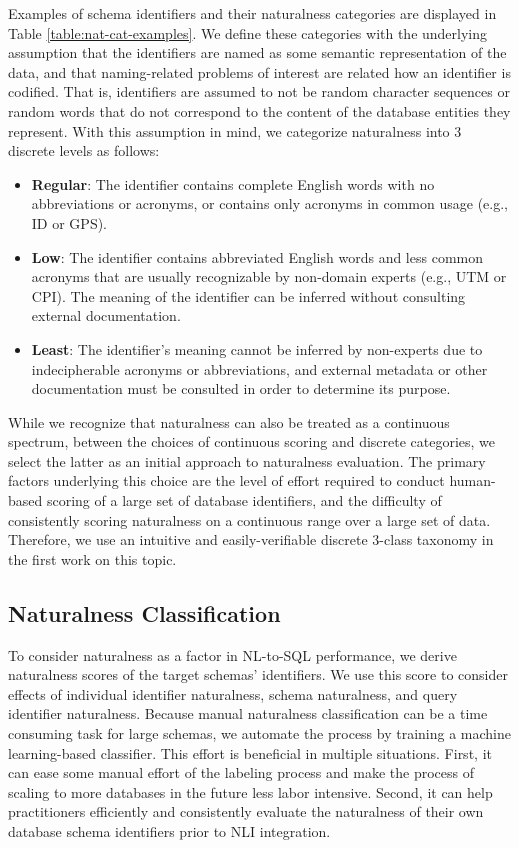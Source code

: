 Examples of schema identifiers and their naturalness categories are displayed in Table \ref{table:nat-cat-examples}.
We define these categories with the underlying assumption that the identifiers are named as some semantic representation of the data, and that naming-related problems of interest are related how an identifier is codified.
That is, identifiers are assumed to not be random character sequences or random words that do not correspond to the content of the database entities they represent.
With this assumption in mind, we categorize naturalness into 3 discrete levels as follows: 
\begin{itemize}
  \item \textbf{Regular}: The identifier contains complete English words with no abbreviations or acronyms, or contains only acronyms in common usage (e.g., ID or GPS).
  \item \textbf{Low}: The identifier contains abbreviated English words and less common acronyms that are usually recognizable by non-domain experts (e.g., UTM or  CPI). The meaning of the identifier can be inferred without consulting external documentation.
  \item \textbf{Least}: The identifier's meaning cannot be inferred by non-experts due to indecipherable acronyms or abbreviations, and external metadata or other documentation must be consulted in order to determine its purpose.
\end{itemize}

While we recognize that naturalness can also be treated as a continuous spectrum, between the choices of continuous scoring and discrete categories, we select the latter as an initial approach to naturalness evaluation.
The primary factors underlying this choice are the level of effort required to conduct human-based scoring of a large set of database identifiers, and the difficulty of consistently scoring naturalness on a continuous range over a large set of data.
Therefore, we use an intuitive and easily-verifiable discrete 3-class taxonomy in the first work on this topic.


\subsection{Naturalness Classification}
\label{subsection:naturalness-scoring}

To consider naturalness as a factor in NL-to-SQL performance, we derive naturalness scores of the target schemas' identifiers.
We use this score to consider effects of individual identifier naturalness, schema naturalness, and query identifier naturalness.
Because manual naturalness classification can be a time consuming task for large schemas, we automate the process by training a machine learning-based classifier.
This effort is beneficial in multiple situations.
First, it can ease some manual effort of the labeling process and make the process of scaling to more databases in the future less labor intensive.
Second, it can help practitioners efficiently and consistently evaluate the naturalness of their own database schema identifiers prior to NLI integration.


